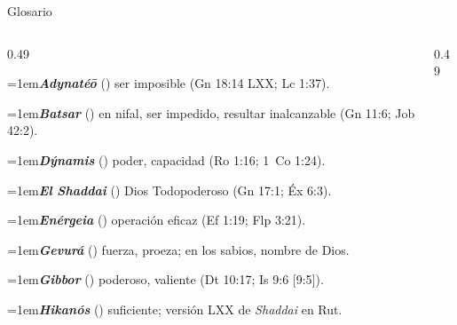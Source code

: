 \begin{frame}{Glosario}
\scriptsize\RaggedRight
\begin{columns}[t,onlytextwidth]
\begin{column}{0.49\textwidth}

\par\noindent\hangindent=1em{\color{azul}\textbf{\emph{Adynatéō}}} () ser imposible (Gn 18:14 LXX; Lc 1:37).\par\vspace{2pt}
\par\noindent\hangindent=1em{\color{azul}\textbf{\emph{Batsar}}} () en nifal, ser impedido, resultar inalcanzable (Gn 11:6; Job 42:2).\par\vspace{2pt}
\par\noindent\hangindent=1em{\color{azul}\textbf{\emph{Dýnamis}}} () poder, capacidad (Ro 1:16; 1~Co 1:24).\par\vspace{2pt}
\par\noindent\hangindent=1em{\color{azul}\textbf{\emph{El Shaddai}}} () Dios Todopoderoso (Gn 17:1; Éx 6:3).\par\vspace{2pt}
\par\noindent\hangindent=1em{\color{azul}\textbf{\emph{Enérgeia}}} () operación eficaz (Ef 1:19; Flp 3:21).\par\vspace{2pt}
\par\noindent\hangindent=1em{\color{azul}\textbf{\emph{Gevurá}}} () fuerza, proeza; en los sabios, nombre de Dios.\par\vspace{2pt}
\par\noindent\hangindent=1em{\color{azul}\textbf{\emph{Gibbor}}} () poderoso, valiente (Dt 10:17; Is 9:6 [9:5]).\par\vspace{2pt}
\par\noindent\hangindent=1em{\color{azul}\textbf{\emph{Hikanós}}} () suficiente; versión LXX de \emph{Shaddai} en Rut.\par\vspace{2pt}

\end{column}
\begin{column}{0.49\textwidth}


\end{column}
\end{columns}
\end{frame}
